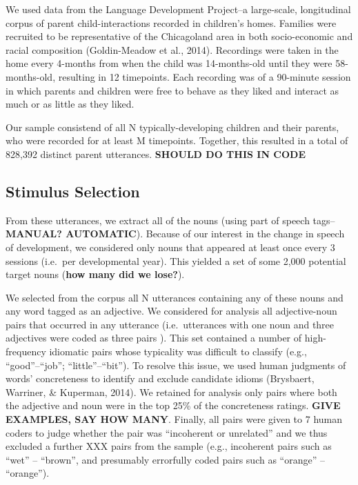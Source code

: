 \documentclass[10pt, letterpaper]{article}
\begin{document}
We used data from the Language Development Project--a large-scale,
longitudinal corpus of parent child-interactions recorded in children's
homes. Families were recruited to be representative of the Chicagoland
area in both socio-economic and racial composition (Goldin-Meadow et
al., 2014). Recordings were taken in the home every 4-months from when
the child was 14-months-old until they were 58-months-old, resulting in
12 timepoints. Each recording was of a 90-minute session in which
parents and children were free to behave as they liked and interact as
much or as little as they liked.

Our sample consistend of all N typically-developing children and their
parents, who were recorded for at least M timepoints. Together, this
resulted in a total of 828,392 distinct parent utterances.
\textbf{SHOULD DO THIS IN CODE}

\hypertarget{stimulus-selection}{%
\subsection{Stimulus Selection}\label{stimulus-selection}}

From these utterances, we extract all of the nouns (using part of speech
tags--\textbf{MANUAL? AUTOMATIC}). Because of our interest in the change
in speech of development, we considered only nouns that appeared at
least once every 3 sessions (i.e.~per developmental year). This yielded
a set of some 2,000 potential target nouns (\textbf{how many did we
lose?}).

We selected from the corpus all N utterances containing any of these
nouns and any word tagged as an adjective. We considered for analysis
all adjective-noun pairs that occurred in any utterance (i.e.~utterances
with one noun and three adjectives were coded as three pairs ). This set
contained a number of high-frequency idiomatic pairs whose typicality
was difficult to classify (e.g., ``good''--``job'';
``little''--``bit''). To resolve this issue, we used human judgments of
words' concreteness to identify and exclude candidate idioms (Brysbaert,
Warriner, \& Kuperman, 2014). We retained for analysis only pairs where
both the adjective and noun were in the top 25\% of the concreteness
ratings. \textbf{GIVE EXAMPLES, SAY HOW MANY}. Finally, all pairs were
given to 7 human coders to judge whether the pair was ``incoherent or
unrelated'' and we thus excluded a further XXX pairs from the sample
(e.g., incoherent pairs such as ``wet'' -- ``brown'', and presumably
errorfully coded pairs such as ``orange'' -- ``orange'').
\end{document}
